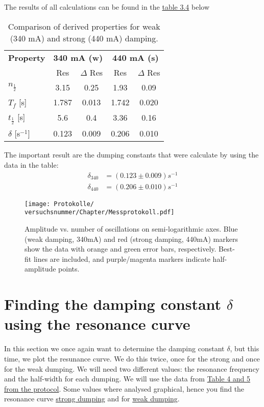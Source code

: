 The results of all calculations can be found in the \hyperref[tab:combined_results]{table 3.4} below

\begin{table}[t!]
    \centering
    \begin{tabular}{l | c c | c c}
        \toprule
        \textbf{Property} & \multicolumn{2}{c|}{\textbf{340 mA (w)}} & \multicolumn{2}{c}{\textbf{440 mA (s)}} \\
        & Res & $\Delta$ Res & Res & $\Delta$ Res \\
        \midrule
        $n_{\frac{1}{2}}$ & 3.15 & 0.25 & 1.93 & 0.09 \\
        $T_f$ [s]          & 1.787 & 0.013 & 1.742 & 0.020 \\
        $t_{\frac{1}{2}}$ [s] & 5.6 & 0.4 & 3.36 & 0.16 \\
        $\delta$ [s$^{-1}$]    & 0.123 & 0.009 & 0.206 & 0.010 \\
        \bottomrule
    \end{tabular}
    \caption{Comparison of derived properties for weak (340 mA) and strong (440 mA) damping.}
    \label{tab:combined_results}
\end{table}

The important result are the dumping constants that were calculate by using the data in the table:
\begin{equation}
    \boxed{
        \begin{aligned}
        \delta_{340} &= (0.123 \pm 0.009)s^{-1} \\
        \delta_{440} &= (0.206 \pm 0.010)s^{-1}
        \end{aligned}
    }
\end{equation}


\onecolumn
\begin{figure}
    \texttt{[image: Protokolle/\\versuchsnummer/Chapter/Messprotokoll.pdf]}
    \caption{Amplitude vs. number of oscillations on semi-logarithmic axes. Blue (weak damping, 340mA) and red (strong damping, 440mA) markers show the data with orange and green error bars, respectively. Best-fit lines are included, and purple/magenta markers indicate half-amplitude points.}
    \label{fig:dumping_on_log}
\end{figure}
\twocolumn

\section{Finding the damping constant $\delta$ using the resonance curve}
In this section we once again want to determine the damping constant $\delta$, but this time, we plot the resunance curve.
We do this twice, once for the strong and once for the weak dumping. We will need two different values: the resonance frequency and the half-width
for each dumping. We will use the data from \hyperref[protocol]{Table 4 and 5 from the protocol}.
Some values where analysed graphical, hence you find the resonance curve \hyperref[fig:curve_strong]{strong dumping} and for \hyperref[fig:curve_weak]{weak dumping}.

